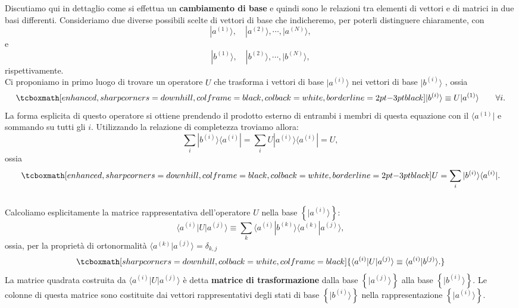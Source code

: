 \documentclass[a4paper,12pt,oneside]{book}
\begin{document}
Discutiamo qui in dettaglio come si effettua un \textbf{cambiamento di base} e quindi sono le relazioni tra elementi di vettori e di matrici in due basi differenti. Consideriamo due diverse possibili scelte di vettori di base che indicheremo, per poterli distinguere chiaramente, con 
	\begin{equation}
		| a^{(1)} \rangle , \quad  | a^{(2)} \rangle , \cdots , | a^{(N)} \rangle ,
	\end{equation}
e
	\begin{equation}
		| b^{(1)} \rangle , \quad | b^{(2)} \rangle , \cdots , | b^{(N)} \rangle ,
	\end{equation}
rispettivamente. \\

Ci proponiamo in primo luogo di trovare un operatore $U$ che trasforma i vettori di base $| a^{(i)} \rangle$ nei vettori di base $| b^{(i)} \rangle $ , ossia 
	\begin{equation}
		\tcboxmath[enhanced, sharp corners=downhill, colframe=black, colback=white, borderline={2pt}{-3pt}{black}]{
			| b^{(i)} \rangle \equiv U | a^{(1)} \rangle 
			}\qquad \forall i .
	\end{equation}
La forma esplicita di questo operatore si ottiene prendendo il prodotto esterno di entrambi i membri di questa equazione con il $\langle a^{(1)}| $ e sommando su tutti gli $i$. Utilizzando la relazione di completezza troviamo allora:
	\begin{equation}
		\sum \limits_{i} | b^{(i)} \rangle \langle a^{(i)} |  = \sum \limits_{i} U | a^{(i)} \rangle \langle a^{(i)} |  = U ,
	\end{equation}
ossia
	\begin{equation}
		\tcboxmath[enhanced, sharp corners=downhill, colframe=black, colback=white, borderline={2pt}{-3pt}{black}]{
			U = \sum \limits_{i} | b^{(i)} \rangle \langle a^{(i)} | .
			}
	\end{equation}\\

Calcoliamo esplicitamente la matrice rappresentativa dell'operatore $U$ nella base $\left\{ | a^{(i)} \rangle    \right\} $:
	\begin{equation}
			\langle a^{(i)} | U | a^{(j)} \rangle \equiv \sum \limits_{k} \langle a^{(i)} | b^{(k)} \rangle  \langle a^{(k)} | a^{(j)} \rangle  ,
	\end{equation}
ossia, per la proprietà di ortonormalità $\langle a^{(k)} | a^{(j)} \rangle  =\delta_{k,j}$
	\begin{equation}
		\tcboxmath[sharp corners=downhill, colback=white, colframe=black]{
			\langle a^{(i)} | U | a^{(j)} \rangle \equiv \langle a^{(i)} | b^{(j)} \rangle .
			}
	\end{equation}
La matrice quadrata costruita da $\langle a^{(i)} | U | a^{(j)} \rangle $ è detta \textbf{matrice di trasformazione} dalla base $\left\{ | a^{(j)} \rangle  \right\}$ alla base $\left\{ | b^{(i)} \rangle  \right\}$. Le colonne di questa matrice sono costituite dai vettori rappresentativi degli stati di base $\left\{ | b^{(i)} \rangle  \right\}$ nella rappresentazione $\left\{ | a^{(i)} \rangle  \right\}$.\\
\end{document}
